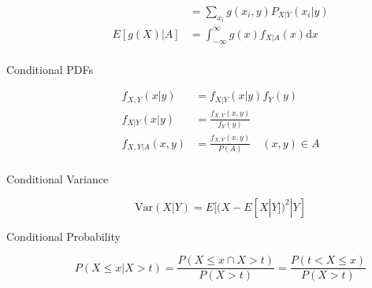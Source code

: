 \documentclass[8pt]{article}
\newcommand{\dd}[1]{\mathrm{d}{#1}}
\begin{document}
\begin{multicols}{2}
\begin{description}
\begin{equation*}
\begin{aligned}
      &= \sum_{x_i} g(x_i,y) P_{X|Y}(x_i|y) \\
      E[g(X)|A] &= \int_{-\infty}^{\infty} g(x) f_{X|A}(x) \dd{x} \\
    \end{aligned}
  \end{equation*}
\item[Conditional PDFs]
  \begin{equation*}
    \begin{aligned}
      f_{X,Y}(x|y) &= f_{X|Y}(x|y)f_Y(y) \\
      f_{X|Y}(x|y) &= \frac{f_{X,Y}(x,y)}{f_Y(y)} \\
      f_{X,Y|A}(x,y) &= \frac{f_{X,Y}(x,y)}{P(A)}\quad (x,y)\in A \\
    \end{aligned}
  \end{equation*}
\item[Conditional Variance]
  $$ \text{Var}(X|Y) = E[(X-E[X|Y])^2|Y] $$
\item[Conditional Probability]
  $$P(X\le x | X > t) = \frac{P({X\le x}\cap {X > t})}{P(X>t)} =
  \frac{P(t<X\le x)}{P(X>t)}$$
\end{description}
\end{multicols}
\end{document}
